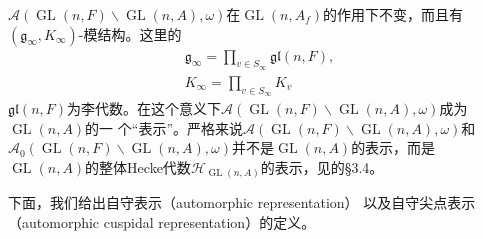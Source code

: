 $\mathcal{A}(\operatorname{GL}(n,F) \backslash \operatorname{GL}(n,A), \omega)$在$\operatorname{GL}(n, A_f)$的作用下不变，而且有$(\mathfrak{g}_\infty,  K_\infty)$-模结构。这里的
\begin{gather*}
    \mathfrak{g}_\infty = \prod\limits_{v\in S_\infty} \mathfrak{gl}(n, F), \\[1em]
    K_\infty = \prod\limits_{v\in S_\infty} K_v
\end{gather*}
$\mathfrak{gl}(n, F)$为李代数。在这个意义下$\mathcal{A}(\operatorname{GL}(n,F) \backslash \operatorname{GL}(n,A), \omega)$成为$\operatorname{GL}(n,A)$的一
个``表示''。严格来说$\mathcal{A}(\operatorname{GL}(n,F) \backslash \operatorname{GL}(n,A), \omega)$和$\mathcal{A}_0(\operatorname{GL}(n,F) \backslash \operatorname{GL}(n,A), \omega)$并不是$\operatorname{GL}(n,A)$的表示，而是$\operatorname{GL}(n,A)$的整体Hecke代数$\mathcal{H}_{\operatorname{GL}(n,A)}$的表示，见的\S 3.4。

下面，我们给出自守表示（automorphic representation） 以及自守尖点表示（automorphic cuspidal representation）的定义。
